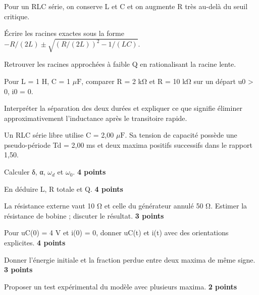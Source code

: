 \label{ex-D3}
Pour un RLC série, on conserve L et C et on augmente R très au-delà du seuil critique.\begin{questions}
\item Écrire les racines exactes sous la forme $-R/(2L)\pm\sqrt{(R/(2L))^2-1/(LC)}$.
\item Retrouver les racines approchées à faible Q en rationalisant la racine lente.
\item Pour L = 1 H, C = 1 $\mu\mathrm{ F}$, comparer R = 2 kΩ et R = 10 kΩ sur un départ u0 > 0, i0 = 0.
\item Interpréter la séparation des deux durées et expliquer ce que signifie éliminer approximativement l’inductance après le transitoire rapide.
\end{questions}


Un RLC série libre utilise C = 2,00 $\mu\mathrm{ F}$. Sa tension de capacité possède une pseudo-période Td = 2,00 ms et deux maxima positifs successifs dans le rapport 1,50.\begin{questions}
\item Calculer δ, α, $\omega_d$ et $\omega_0$. \textbf{4 points}
\item En déduire L, R totale et Q. \textbf{4 points}
\item La résistance externe vaut 10 Ω et celle du générateur annulé 50 Ω. Estimer la résistance de bobine ; discuter le résultat. \textbf{3 points}
\item Pour uC(0) = 4 V et i(0) = 0, donner uC(t) et i(t) avec des orientations explicites. \textbf{4 points}
\item Donner l’énergie initiale et la fraction perdue entre deux maxima de même signe. \textbf{3 points}
\item Proposer un test expérimental du modèle avec plusieurs maxima. \textbf{2 points}
\end{questions}


